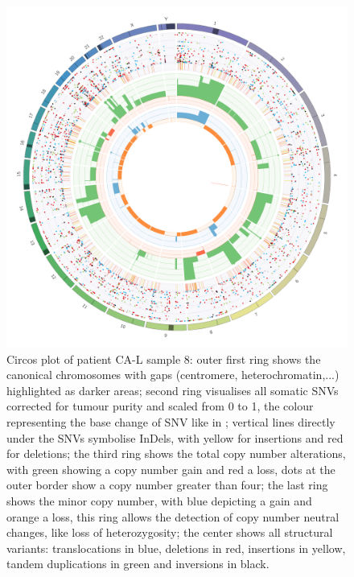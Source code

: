 \begin{figure}[ht]
\centering
\includegraphics[width=.99\linewidth]{Figures/CASCADE/CA86/CA86-8.circos.png}
\caption[Circos plot of patient CA-L sample 8]{Circos plot of patient CA-L sample 8: outer first ring shows the canonical chromosomes with gaps (centromere, heterochromatin,...) highlighted as darker areas; second ring visualises all somatic SNVs corrected for tumour purity and scaled from 0 to 1, the colour representing the base change of SNV like in \protect\textcite{Alexandrov2013}; vertical lines directly under the SNVs symbolise InDels, with yellow for insertions and red for deletions; the third ring shows the total copy number alterations, with green showing a copy number gain and red a loss, dots at the outer border show a copy number greater than four; the last ring shows the minor copy number, with blue depicting a gain and orange a loss, this ring allows the detection of copy number neutral changes, like loss of heterozygosity; the center shows all structural variants: translocations in blue, deletions in red, insertions in yellow, tandem duplications in green and inversions in black.} \label{fig:ca86.8circos}
\end{figure}


